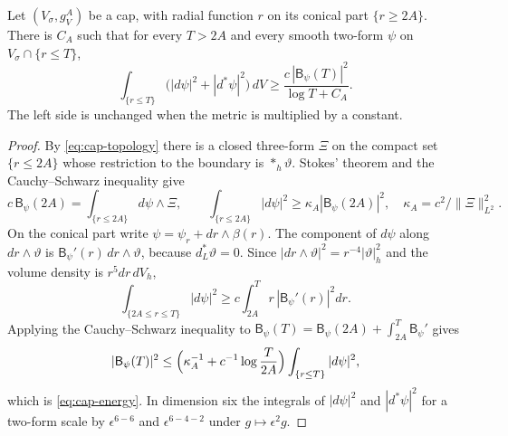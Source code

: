 \begin{lemma}\label{lem:cap-energy}
Let $(V_\sigma,g_V^A)$ be a cap, with radial function $r$ on its conical
part $\{r\ge2A\}$. There is $C_A$ such that for every $T>2A$ and every
smooth two-form $\psi$ on $V_\sigma\cap\{r\le T\}$,
\begin{equation}\label{eq:cap-energy}
 \int_{\{r\le T\}}\bigl(|d\psi|^2+|d^*\psi|^2\bigr)\,dV
 \ge\frac{c\,|\mathsf B_\psi(T)|^2}{\log T+C_A}.
\end{equation}
The left side is unchanged when the metric is multiplied by a constant.
\end{lemma}
\begin{proof}
By \eqref{eq:cap-topology} there is a closed three-form $\Xi$ on the
compact set $\{r\le2A\}$ whose restriction to the boundary is
$*_h\vartheta$. Stokes' theorem and the Cauchy--Schwarz inequality give
\[
 c\,\mathsf B_\psi(2A)=\int_{\{r\le2A\}}d\psi\wedge\Xi,\qquad
 \int_{\{r\le2A\}}|d\psi|^2\ge\kappa_A|\mathsf B_\psi(2A)|^2,
 \quad\kappa_A=c^2/\|\Xi\|^2_{L^2}.
\]
On the conical part write $\psi=\psi_r+dr\wedge\beta(r)$. The component
of $d\psi$ along $dr\wedge\vartheta$ is $\mathsf B_\psi'(r)\,dr\wedge
\vartheta$, because $d_L^*\vartheta=0$. Since
$|dr\wedge\vartheta|^2=r^{-4}|\vartheta|_h^2$ and the volume density is
$r^5dr\,dV_h$,
\[
 \int_{\{2A\le r\le T\}}|d\psi|^2\ge c\int_{2A}^Tr\,|\mathsf B_\psi'(r)|^2dr .
\]
Applying the Cauchy--Schwarz inequality to
$\mathsf B_\psi(T)=\mathsf B_\psi(2A)+\int_{2A}^T\mathsf B_\psi'$ gives
\[
 |\mathsf B_\psi(T)|^2\le\Bigl(\kappa_A^{-1}+c^{-1}\log\frac T{2A}\Bigr)
 \int_{\{r\le T\}}|d\psi|^2 ,
\]
which is \eqref{eq:cap-energy}. In dimension six the integrals of
$|d\psi|^2$ and $|d^*\psi|^2$ for a two-form scale by
$\epsilon^{6-6}$ and $\epsilon^{6-4-2}$ under $g\mapsto\epsilon^2g$.
\end{proof}

